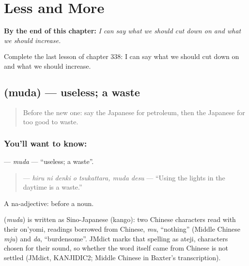 
\chapter{Less and More}
\label{ch:ja-less-and-more}

\begin{chapteropening}
\textbf{By the end of this chapter:} \emph{I can say what we should cut down on and what we should increase.}

Complete the last lesson of chapter 338: I can say what we should cut down on and what we should increase.
\end{chapteropening}

\section[\texorpdfstring{\ja{むだ} (muda)}{むだ (muda)}]{ (muda) — useless; a waste}

\label{lesson:JA-C338-muda}



\begin{quote}
Before the new one: say the Japanese for petroleum, then the Japanese for too good to waste.
\end{quote}

\subsection*{You'll want to know: }
\textbf{} — \emph{muda} — \textquotedblleft{}useless; a waste\textquotedblright{}.

\begin{quote}
\textbf{  } — \emph{hiru ni denki o tsukattara, muda desu} — \textquotedblleft{}Using the lights in the daytime is a waste.\textquotedblright{}
\end{quote}

A na-adjective:  before a noun.

\begin{cousinweb}
\textbf{} (\emph{muda}) is written as Sino-Japanese (kango): two Chinese characters read with their on'yomi, readings borrowed from Chinese, \emph{mu}, \textquotedblleft{}nothing\textquotedblright{} (Middle Chinese \emph{mju}) and \emph{da}, \textquotedblleft{}burdensome\textquotedblright{}. JMdict marks that spelling as ateji, characters chosen for their sound, so whether the word itself came from Chinese is not settled (JMdict, KANJIDIC2; Middle Chinese in Baxter's transcription).
\end{cousinweb}

